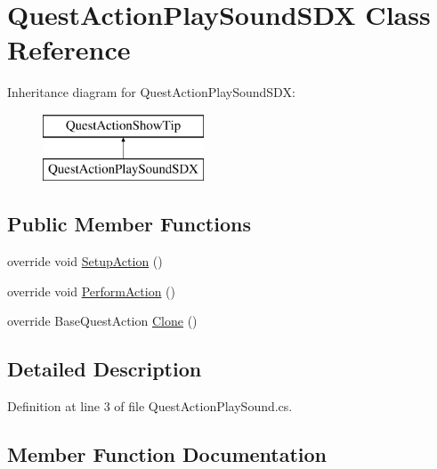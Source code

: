 \hypertarget{class_quest_action_play_sound_s_d_x}{}\section{Quest\+Action\+Play\+Sound\+S\+DX Class Reference}
\label{class_quest_action_play_sound_s_d_x}
Inheritance diagram for Quest\+Action\+Play\+Sound\+S\+DX\+:\begin{figure}[H]
\begin{center}
\leavevmode
\includegraphics[height=2.000000cm]{class_quest_action_play_sound_s_d_x}
\end{center}
\end{figure}
\subsection*{Public Member Functions}
\begin{DoxyCompactItemize}
\item 
override void \mbox{\hyperlink{class_quest_action_play_sound_s_d_x_a887c9ac83758b008b58939209df166ec}{Setup\+Action}} ()
\item 
override void \mbox{\hyperlink{class_quest_action_play_sound_s_d_x_a388750909751148ff6b1d7cac8d71c6e}{Perform\+Action}} ()
\item 
override Base\+Quest\+Action \mbox{\hyperlink{class_quest_action_play_sound_s_d_x_a697994edb028af4b3ffd872de05d5053}{Clone}} ()
\end{DoxyCompactItemize}


\subsection{Detailed Description}


Definition at line 3 of file Quest\+Action\+Play\+Sound.\+cs.



\subsection{Member Function Documentation}
\mbox{\label{class_quest_action_play_sound_s_d_x_a697994edb028af4b3ffd872de05d5053}} 
